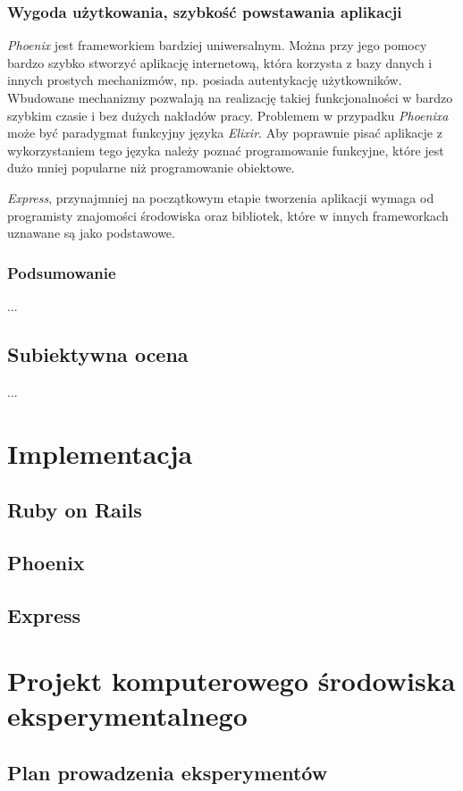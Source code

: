 \documentclass[mgr,oneside]{mgr}
\begin{document}
\subsection{Wygoda użytkowania, szybkość powstawania aplikacji}
\emph{Phoenix} jest frameworkiem bardziej uniwersalnym. Można przy jego pomocy bardzo szybko stworzyć aplikację internetową, która korzysta z bazy danych i innych prostych mechanizmów, np. posiada autentykację użytkowników. Wbudowane mechanizmy pozwalają na realizację takiej funkcjonalności w bardzo szybkim czasie i bez dużych nakładów pracy. Problemem w przypadku \emph{Phoenixa} może być paradygmat funkcyjny języka \emph{Elixir}. Aby poprawnie pisać aplikacje z wykorzystaniem tego języka należy poznać programowanie funkcyjne, które jest dużo mniej popularne niż programowanie obiektowe.

\emph{Express}, przynajmniej na początkowym etapie tworzenia aplikacji wymaga od programisty znajomości środowiska oraz bibliotek, które w innych frameworkach uznawane są jako podstawowe. 
\subsection{Podsumowanie} %
...

\section{Subiektywna ocena}
...

\chapter{Implementacja}
\section{Ruby on Rails}
\section{Phoenix}
\section{Express}

\chapter{Projekt komputerowego środowiska eksperymentalnego}
\section{Plan prowadzenia eksperymentów}
\end{document}

